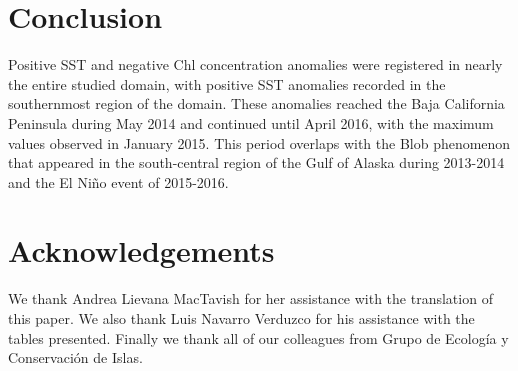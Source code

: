 \documentclass{article} %
\begin{document}
\section{Conclusion	}

Positive SST and negative Chl concentration anomalies were registered in nearly the entire studied domain, with positive SST anomalies recorded in the southernmost region of the domain. These anomalies reached the Baja California Peninsula during May 2014 and continued until April 2016, with the maximum values observed in January 2015. This period overlaps with the Blob phenomenon that appeared in the south-central region of the Gulf of Alaska during 2013-2014 and the El Niño event of 2015-2016.\\

\section{Acknowledgements}

We thank Andrea Lievana MacTavish for her assistance with the translation of this paper. We also thank Luis Navarro Verduzco for his assistance with the tables presented. Finally we thank all of our colleagues from Grupo de Ecología y Conservación de Islas.\\
\end{document}
